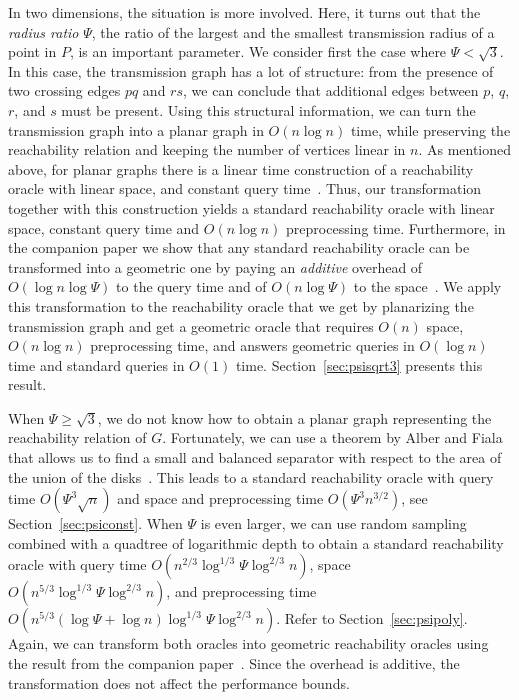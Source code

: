 \documentclass[11pt,a4paper]{paper}
\begin{document}
In two dimensions, the situation is more involved.
Here, it turns out that the \emph{radius ratio} $\Psi$, the ratio of the
largest and the smallest transmission radius of a point in $P$, is
an important parameter.
We consider first the case where $\Psi < \sqrt{3}$. In this case,
the transmission graph has a lot
of structure: from the presence of two crossing edges $pq$ and
$rs$, we can conclude that additional edges between
$p$, $q$, $r$, and $s$ must be present.
Using this structural information, we can turn the
transmission graph into a planar graph in $O(n\log n)$ time,
while preserving the reachability relation
and keeping the number of vertices linear in $n$.
As mentioned above, for planar graphs there is a linear time
construction of a reachability oracle with linear space, and
constant query time~\cite{Holm2015}. Thus, our transformation together with
this construction yields a standard
reachability oracle with linear space, constant query time 
and $O(n\log n)$ preprocessing time. Furthermore, in the companion paper
we show that any standard reachability oracle can be
transformed into a  geometric one by paying an \emph{additive}
overhead of $O(\log n \log \Psi)$ to the query time and of $O(n \log \Psi)$
to the space~\cite{KaplanEtAl15}. We apply this transformation to the reachability oracle that we get
by planarizing the transmission graph and get a geometric oracle that requires  $O(n)$
space, $O(n\log n)$ preprocessing time, and  answers geometric queries in $O(\log n)$ time  and standard queries in $O(1)$ time.
 Section~\ref{sec:psisqrt3} presents this result.


When $\Psi \ge \sqrt{3}$, we do not know how to obtain a planar graph representing
the reachability relation of $G$.
Fortunately, we can use a theorem by Alber and Fiala that allows us
to find a small and balanced separator with respect to the area of the union
of the disks~\cite{AlberFiala04}. This leads to
a standard reachability oracle with query time $O(\Psi^3\sqrt{n})$
and space and preprocessing time $O(\Psi^3 n^{3/2})$,
see Section~\ref{sec:psiconst}.
When $\Psi$ is even larger, we
can use random sampling combined with a quadtree of logarithmic
depth
to obtain a standard reachability oracle with query time $O(n^{2/3}\log^{1/3} \Psi \log^{2/3} n)$,
space $O(n^{5/3}\log^{1/3} \Psi \log^{2/3} n)$, and
preprocessing time $O(n^{5/3}(\log \Psi + \log n) \log^{1/3} \Psi \log^{2/3} n)$. Refer to
Section~\ref{sec:psipoly}.
Again, we can transform both oracles
into  geometric reachability oracles using the result from the
companion paper~\cite{KaplanEtAl15}. Since the overhead is
additive, the transformation does not affect the performance bounds.
\end{document}
